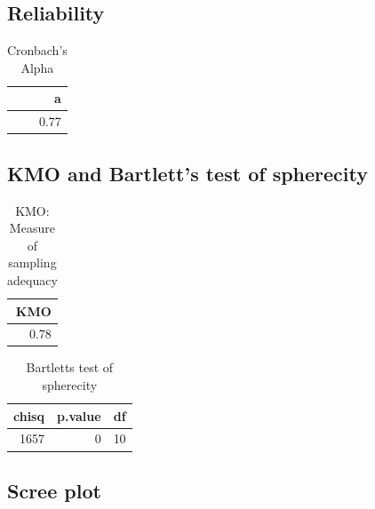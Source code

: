 \documentclass[]{article}
\begin{document}
\hypertarget{reliability-12}{%
\subsection{Reliability}\label{reliability-12}}

\begin{table}[H]

\caption{\label{tab:unnamed-chunk-68}Cronbach's Alpha}
\centering
\fontsize{6}{8}\selectfont
\begin{tabular}[t]{r}
\toprule
a\\
\midrule
0.77\\
\bottomrule
\end{tabular}
\end{table}

\hypertarget{kmo-and-bartletts-test-of-spherecity-13}{%
\subsection{KMO and Bartlett's test of
spherecity}\label{kmo-and-bartletts-test-of-spherecity-13}}

\begin{table}[H]

\caption{\label{tab:unnamed-chunk-69}KMO: Measure of sampling adequacy}
\centering
\fontsize{6}{8}\selectfont
\begin{tabular}[t]{r}
\toprule
KMO\\
\midrule
0.78\\
\bottomrule
\end{tabular}
\end{table}

\begin{table}[H]

\caption{\label{tab:unnamed-chunk-69}Bartletts test of spherecity}
\centering
\fontsize{6}{8}\selectfont
\begin{tabular}[t]{rrr}
\toprule
chisq & p.value & df\\
\midrule
1657 & 0 & 10\\
\bottomrule
\end{tabular}
\end{table}

\hypertarget{scree-plot-13}{%
\subsection{Scree plot}\label{scree-plot-13}}
\end{document}
